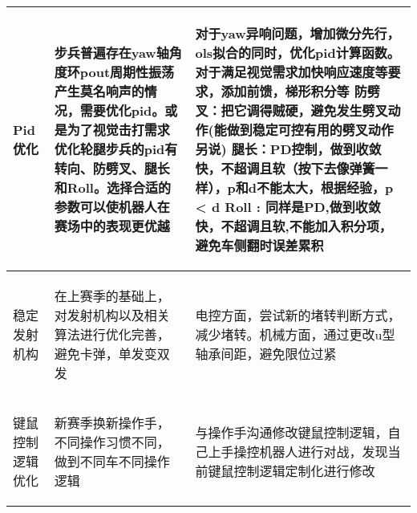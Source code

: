 \begin{longtable}{ p{2cm} | p{7.8cm} | p{6cm} |}
        \begin{center}
            Pid优化
        \end{center} &
        \begin{center}
            步兵普遍存在yaw轴角度环pout周期性振荡产生莫名响声的情况，需要优化pid。或是为了视觉击打需求优化轮腿步兵的pid有转向、防劈叉、腿长和Roll。选择合适的参数可以使机器人在赛场中的表现更优越
        \end{center} &
        \begin{center}
            对于yaw异响问题，增加微分先行，ols拟合的同时，优化pid计算函数。对于满足视觉需求加快响应速度等要求，添加前馈，梯形积分等
            \newline 防劈叉：把它调得贼硬，避免发生劈叉动作(能做到稳定可控有用的劈叉动作另说)
            \newline 腿长：PD控制，做到收敛快，不超调且软（按下去像弹簧一样），p和d不能太大，根据经验，p < d
            \newline Roll : 同样是PD,做到收敛快，不超调且软,不能加入积分项，避免车侧翻时误差累积
        \end{center} \\
        
    \hline
    
        \begin{center}
            稳定发射机构
        \end{center} &
        \begin{center}
            在上赛季的基础上，对发射机构以及相关算法进行优化完善，避免卡弹，单发变双发
        \end{center} &
        \begin{center}
            电控方面，尝试新的堵转判断方式，减少堵转。机械方面，通过更改u型轴承间距，避免限位过紧
        \end{center} \\
        
    \hline
    
        \begin{center}
            键鼠控制逻辑优化
        \end{center} &
        \begin{center}
            新赛季换新操作手，不同操作习惯不同，做到不同车不同操作逻辑
        \end{center} &
        \begin{center}
            与操作手沟通修改键鼠控制逻辑，自己上手操控机器人进行对战，发现当前键鼠控制逻辑定制化进行修改
        \end{center} \\
        

\end{longtable}
